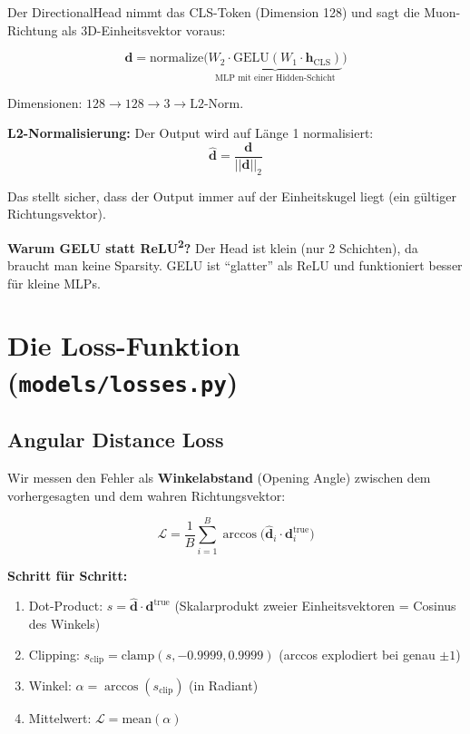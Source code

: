 \documentclass[12pt, a4paper]{article}
\begin{document}
Der DirectionalHead nimmt das CLS-Token (Dimension 128) und sagt die
Muon-Richtung als 3D-Einheitsvektor voraus:

\[
    \mathbf{d} = \text{normalize}\big(\underbrace{W_2 \cdot \text{GELU}(W_1 \cdot \mathbf{h}_\text{CLS})}_\text{MLP mit einer Hidden-Schicht}\big)
\]

Dimensionen: $128 \to 128 \to 3 \to \text{L2-Norm}$.

\textbf{L2-Normalisierung:} Der Output wird auf L\"ange 1 normalisiert:
\[
    \hat{\mathbf{d}} = \frac{\mathbf{d}}{||\mathbf{d}||_2}
\]

Das stellt sicher, dass der Output immer auf der Einheitskugel liegt
(ein g\"ultiger Richtungsvektor).

\textbf{Warum GELU statt ReLU\textsuperscript{2}?} Der Head ist klein
(nur 2 Schichten), da braucht man keine Sparsity. GELU ist ``glatter''
als ReLU und funktioniert besser f\"ur kleine MLPs.


\section{Die Loss-Funktion (\texttt{models/losses.py})}

\subsection{Angular Distance Loss}

Wir messen den Fehler als \textbf{Winkelabstand} (Opening Angle) zwischen
dem vorhergesagten und dem wahren Richtungsvektor:

\[
    \mathcal{L} = \frac{1}{B} \sum_{i=1}^{B} \arccos\big(\hat{\mathbf{d}}_i \cdot \mathbf{d}_i^{\text{true}}\big)
\]

\textbf{Schritt f\"ur Schritt:}
\begin{enumerate}
    \item Dot-Product: $s = \hat{\mathbf{d}} \cdot \mathbf{d}^{\text{true}}$
          \quad (Skalarprodukt zweier Einheitsvektoren = Cosinus des Winkels)
    \item Clipping: $s_\text{clip} = \text{clamp}(s, -0.9999, 0.9999)$
          \quad (arccos explodiert bei genau $\pm 1$)
    \item Winkel: $\alpha = \arccos(s_\text{clip})$ \quad (in Radiant)
    \item Mittelwert: $\mathcal{L} = \text{mean}(\alpha)$
\end{enumerate}
\end{document}
